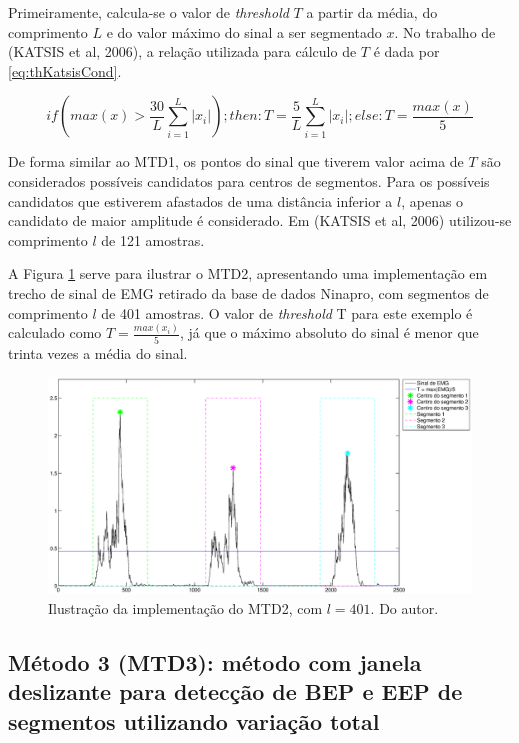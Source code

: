 \documentclass[
	12pt,				%
	openright,			%
	oneside,
	a4paper,			%
	english,			%
	francais,			%
	spanish,			%
	brazil				%
	]{abntex2}
\begin{document}
	Primeiramente, calcula-se o valor de \emph{threshold} $T$ a partir da média, do comprimento $L$ e do valor máximo do sinal a ser segmentado $x$. No trabalho de (KATSIS et al, 2006), a relação utilizada para cálculo de $T$ é dada por \ref{eq:thKatsisCond}.

\begin{equation}
\label{eq:thKatsisCond}
	if\left(max(x) > \frac{30}{L}\sum_{i=1}^{L}|x_i|\right); then: T = \frac{5}{L}\sum_{i=1}^{L}|x_i|; else: T = \frac{max(x)}{5}
\end{equation}

	De forma similar ao MTD1, os pontos do sinal que tiverem valor acima de $T$ são considerados possíveis candidatos para centros de segmentos. Para os possíveis candidatos que estiverem afastados de uma distância inferior a $l$, apenas o candidato de maior amplitude é considerado. Em (KATSIS et al, 2006) utilizou-se comprimento $l$ de 121 amostras.
	
	A Figura \ref{fig:mtd1example} serve para ilustrar o MTD2, apresentando uma implementação em trecho de sinal de EMG retirado da base de dados Ninapro, com segmentos de comprimento $l$ de 401 amostras. O valor de \emph{threshold} T para este exemplo é calculado como $T = \frac{max(x_i)}{5}$, já que o máximo absoluto do sinal é menor que trinta vezes a média do sinal.

\begin{figure}
\centering
\includegraphics[width=\linewidth]{./img/mtd2example.eps}
\caption{Ilustração da implementação do MTD2, com $l = 401$. Do autor.}
\label{fig:mtd1example}
\end{figure}
	
\subsection{Método 3 (MTD3): método com janela deslizante para detecção de BEP e EEP de segmentos utilizando variação total}
\end{document}

